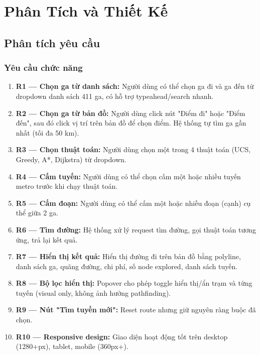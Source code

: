 
\chapter{Phân Tích và Thiết Kế}

\section{Phân tích yêu cầu}

\subsection{Yêu cầu chức năng}

\begin{enumerate}
  \item \textbf{R1 --- Chọn ga từ danh sách:} Người dùng có thể chọn ga đi và ga đến từ dropdown danh sách 411 ga, có hỗ trợ typeahead/search nhanh.

  \item \textbf{R2 --- Chọn ga từ bản đồ:} Người dùng click nút "Điểm đi" hoặc "Điểm đến", sau đó click vị trí trên bản đồ để chọn điểm. Hệ thống tự tìm ga gần nhất (tối đa 50 km).

  \item \textbf{R3 --- Chọn thuật toán:} Người dùng chọn một trong 4 thuật toán (UCS, Greedy, A*, Dijkstra) từ dropdown.

  \item \textbf{R4 --- Cấm tuyến:} Người dùng có thể chọn cấm một hoặc nhiều tuyến metro trước khi chạy thuật toán.

  \item \textbf{R5 --- Cấm đoạn:} Người dùng có thể cấm một hoặc nhiều đoạn (cạnh) cụ thể giữa 2 ga.

  \item \textbf{R6 --- Tìm đường:} Hệ thống xử lý request tìm đường, gọi thuật toán tương ứng, trả lại kết quả.

  \item \textbf{R7 --- Hiển thị kết quả:} Hiển thị đường đi trên bản đồ bằng polyline, danh sách ga, quãng đường, chi phí, số node explored, danh sách tuyến.

  \item \textbf{R8 --- Bộ lọc hiển thị:} Popover cho phép toggle hiển thị/ẩn trạm và từng tuyến (visual only, không ảnh hưởng pathfinding).

  \item \textbf{R9 --- Nút "Tìm tuyến mới":} Reset route nhưng giữ nguyên ràng buộc đã chọn.

  \item \textbf{R10 --- Responsive design:} Giao diện hoạt động tốt trên desktop (1280+px), tablet, mobile (360px+).
\end{enumerate}

